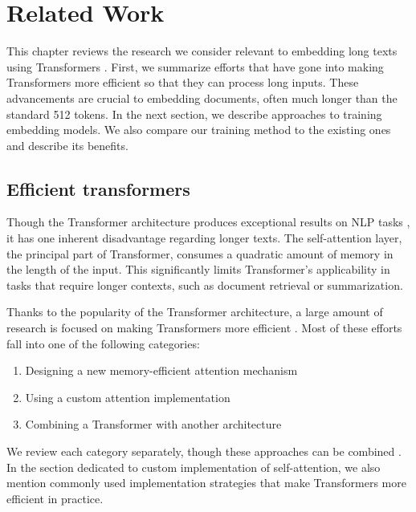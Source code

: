 \chapter{Related Work}\label{chapter:related_work}

This chapter reviews the research we consider relevant to embedding long texts
using Transformers \citep{vaswani2017attention}. First, we summarize efforts
that have gone into making Transformers more efficient so that they can process
long inputs. These advancements are crucial to embedding documents, often much
longer than the standard 512 tokens. In the next section, we describe
approaches to training embedding models. We also compare our training method to
the existing ones and describe its benefits.

\section{Efficient transformers}\label{section:efficient_transformers}

Though the Transformer architecture produces exceptional results on NLP tasks
\citep{devlin2019bert, liu2019roberta, reimers2019sentence}, it has one
inherent disadvantage regarding longer texts. The self-attention layer, the
principal part of Transformer, consumes a quadratic amount of memory in the
length of the input. This significantly limits Transformer's applicability in
tasks that require longer contexts, such as document retrieval or
summarization.

Thanks to the popularity of the Transformer architecture, a large
amount of research is focused on making Transformers more
efficient \citep{tay2022efficient}. Most of these efforts fall into one of the
following categories:

\begin{enumerate}

    \item Designing a new memory-efficient attention mechanism

    \item Using a custom attention implementation

    \item Combining a Transformer with another architecture

\end{enumerate}

We review each category separately, though these approaches can be
combined \citep{child2019generating,beltagy2020longformer}. In the section
dedicated to custom implementation of self-attention, we also mention commonly
used implementation strategies that make Transformers more efficient in
practice.

